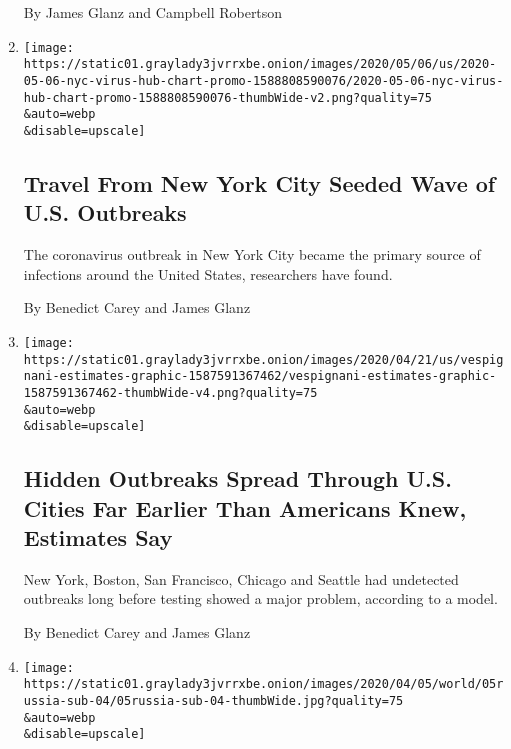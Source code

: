 \begin{enumerate}
  By James Glanz and Campbell Robertson
\item
  \href{/2020/05/07/us/new-york-city-coronavirus-outbreak.html}{}

  \texttt{[image: https://static01.graylady3jvrrxbe.onion/images/2020/05/06/us/2020-05-06-nyc-virus-hub-chart-promo-1588808590076/2020-05-06-nyc-virus-hub-chart-promo-1588808590076-thumbWide-v2.png?quality=75\\\&auto=webp\\\&disable=upscale]}

  \hypertarget{travel-from-new-york-city-seeded-wave-of-us-outbreaks}{%
  \subsection{Travel From New York City Seeded Wave of U.S.
  Outbreaks}\label{travel-from-new-york-city-seeded-wave-of-us-outbreaks}}

  The coronavirus outbreak in New York City became the primary source of
  infections around the United States, researchers have found.

  By Benedict Carey and James Glanz
\item
  \href{/2020/04/23/us/coronavirus-early-outbreaks-cities.html}{}

  \texttt{[image: https://static01.graylady3jvrrxbe.onion/images/2020/04/21/us/vespignani-estimates-graphic-1587591367462/vespignani-estimates-graphic-1587591367462-thumbWide-v4.png?quality=75\\\&auto=webp\\\&disable=upscale]}

  \hypertarget{hidden-outbreaks-spread-through-us-cities-far-earlier-than-americans-knew-estimates-say}{%
  \subsection{Hidden Outbreaks Spread Through U.S. Cities Far Earlier
  Than Americans Knew, Estimates
  Say}\label{hidden-outbreaks-spread-through-us-cities-far-earlier-than-americans-knew-estimates-say}}

  New York, Boston, San Francisco, Chicago and Seattle had undetected
  outbreaks long before testing showed a major problem, according to a
  model.

  By Benedict Carey and James Glanz
\item
  \href{/2020/04/20/world/europe/russian-submarine-fire-losharik.html}{}

  \texttt{[image: https://static01.graylady3jvrrxbe.onion/images/2020/04/05/world/05russia-sub-04/05russia-sub-04-thumbWide.jpg?quality=75\\\&auto=webp\\\&disable=upscale]}


\end{enumerate}
